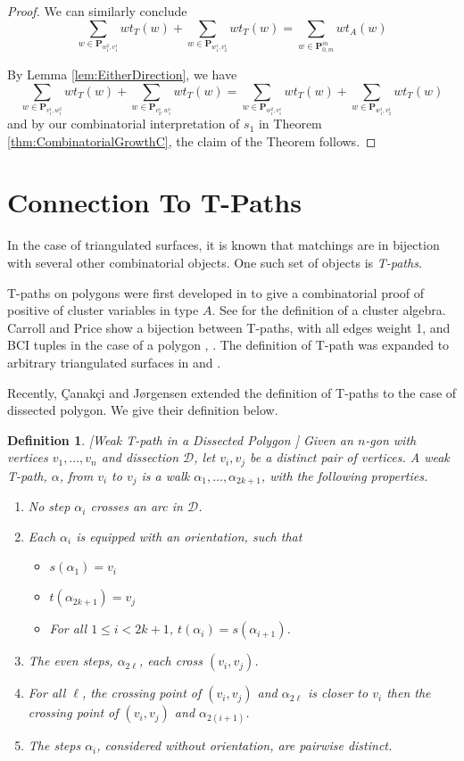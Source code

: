 \documentclass[12pt]{article}
\newtheorem{definition}{Definition}
\theoremstyle{remark}
\newcommand*{\pathset}[2]{\mathbf{P}_{#1,#2}}
\newcommand*{\D}{\mathcal{D}}
\begin{document}
\begin{proof}
We can similarly conclude \[
\sum_{w \in \pathset{w_1^2}{v_1^1}} wt_T(w) + \sum_{w \in \pathset{w_1^1}{v_2^1}} wt_T(w) = \sum_{w \in \pathset{0}{m}^{in}} wt_A(w)
\]

By Lemma \ref{lem:EitherDirection}, we have \[
\sum_{w \in \pathset{v_1^1}{w_1^2}} wt_T(w) + \sum_{w \in \pathset{v_2^1}{w_1^1}} wt_T(w) = \sum_{w \in \pathset{w_1^2}{v_1^1}} wt_T(w) + \sum_{w \in \pathset{w_1^1}{v_2^1}} wt_T(w) 
\]
and by our combinatorial interpretation of $s_1$ in Theorem \ref{thm:CombinatorialGrowthC}, the claim of the Theorem follows. 


\end{proof}

\section{Connection To T-Paths}

In the case of triangulated surfaces, it is known that matchings are in bijection with several other combinatorial objects. One such set of objects is \emph{T-paths}. 

T-paths on polygons were first developed in \cite{18} to give a combinatorial proof of positive of cluster variables in type $A$. See \cite{12} for the definition of a cluster algebra.  Carroll and Price show a bijection between T-paths, with all edges weight 1, and BCI tuples in the case of a polygon \cite{9}, \cite{17}. The definition of T-path was expanded to arbitrary triangulated surfaces in \cite{19} and \cite{16}.

Recently, \c{C}anak\c{c}i and J{\o}rgensen extended the definition of T-paths to the case of dissected polygon. We give their definition below. 
\begin{definition}\label{def:Tpath}[Weak T-path in a Dissected Polygon \cite{8}]
Given an $n$-gon with vertices $v_1,\ldots,v_n$ and dissection $\D$, let $v_i,v_j$ be a distinct pair of vertices. A \emph{weak T-path}, $\alpha$, from $v_i$ to $v_j$ is a walk $\alpha_1,\ldots,\alpha_{2k+1}$, with the following properties. \begin{enumerate}
    \item No step $\alpha_i$ crosses an arc in $\D$.
    \item Each $\alpha_i$ is equipped with an orientation, such that
    \begin{itemize}
    \item $s(\alpha_1) = v_i$
    \item $t(\alpha_{2k+1}) = v_j$
    \item For all $1 \leq i < 2k+1$, $t(\alpha_i) = s(\alpha_{i+1})$.
    \end{itemize}
    \item The even steps, $\alpha_{2\ell}$, each cross $(v_i,v_j)$.
    \item For all $\ell$, the crossing point of $(v_i,v_j)$ and $\alpha_{2\ell}$ is closer to $v_i$ then the crossing point of $(v_i,v_j)$ and $\alpha_{2(i+1)}$.
    \item The steps $\alpha_i$, considered without orientation, are pairwise distinct.
\end{enumerate}
\end{definition}
\end{document}
